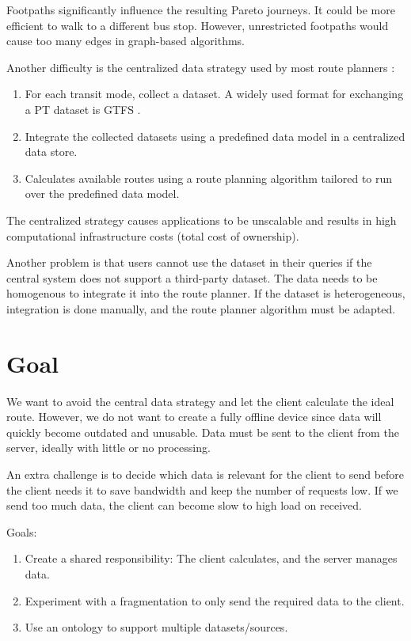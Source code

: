 Footpaths significantly influence the resulting Pareto journeys. It could be more efficient to walk to a different bus stop. However, unrestricted footpaths would cause too many edges in graph-based algorithms.

Another difficulty is the centralized data strategy used by most route planners \cite{rojas_melendez_julian_andres_decentralized_2020}:
\begin{enumerate}
    \item For each transit mode, collect a dataset. A widely used format for exchanging a PT dataset is GTFS \cite{noauthor_gtfs_2022}.
    \item Integrate the collected datasets using a predefined data model in a centralized data store.
    \item Calculates available routes using a route planning algorithm tailored to run over the predefined data model.
\end{enumerate}
The centralized strategy causes applications to be unscalable and results in high computational infrastructure costs (total cost of ownership). 

Another problem is that users cannot use the dataset in their queries if the central system does not support a third-party dataset. The data needs to be homogenous to integrate it into the route planner. If the dataset is heterogeneous, integration is done manually, and the route planner algorithm must be adapted.

\section{Goal}

We want to avoid the central data strategy and let the client calculate the ideal route. However, we do not want to create a fully offline device since data will quickly become outdated and unusable. Data must be sent to the client from the server, ideally with little or no processing. 

An extra challenge is to decide which data is relevant for the client to send before the client needs it to save bandwidth and keep the number of requests low. If we send too much data, the client can become slow to high load on received.
 
Goals:
\begin{enumerate}
    \item Create a shared responsibility: The client calculates, and the server manages data.
    \item Experiment with a fragmentation to only send the required data to the client.
    \item Use an ontology to support multiple datasets/sources.
\end{enumerate}


